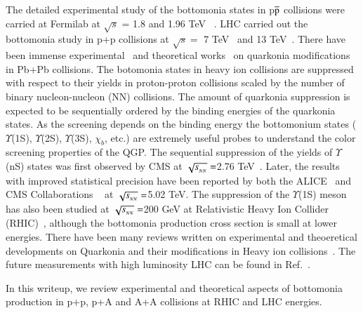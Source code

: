 The detailed experimental study of the bottomonia states in p$\overline{\rm p}$ collisions 
were carried at Fermilab at $\surd s$ = 1.8 and 1.96 TeV ~\cite{CDF:1995gwi,CDF:2001fdy,D0:2005klj}.
LHC carried out the bottomonia study in p+p collisions at
$\surd s=$ 7 TeV~\cite{CMS:2010wld,CMS:2015xqv,ATLAS:2012lmu} and
13 TeV~\cite{CMS:2017dju,LHCb:2018yzj}.
There have been immense
experimental~\cite{Sirunyan:2017isk,Sirunyan:2017lzi,CMS:2018zza,Acharya:2019iur,ALICE:2018wzm}
and theoretical works~\cite{Strickland:2011mw,Song:2011nu,Kumar:2014kfa,Kumar:2019xdj} on
quarkonia modifications in Pb+Pb collisions.
The botomonia states in heavy ion collisions are suppressed with respect to their yields
in proton-proton collisions scaled by the number of binary nucleon-nucleon
(NN) collisions.
The amount of quarkonia suppression is expected to be sequentially ordered by the binding
energies of the quarkonia states.
 As the screening depends on the  binding energy the bottomonium states ($\Upsilon$(1S), $\Upsilon$(2S),
$\Upsilon$(3S), $\chi_{b}$, etc.) are extremely useful probes to understand the color screening
properties of the QGP.
The sequential suppression of the yields of $\Upsilon$(nS) states was first observed by
CMS at $\sqrt{s_{_{NN}}} =$2.76 TeV~\cite{Chatrchyan:2011pe,Chatrchyan:2012lxa}. Later, the results with
improved statistical precision have been reported by both the ALICE~\cite{ALICE:2018wzm}
and CMS Collaborations ~\cite{Sirunyan:2017lzi,CMS:2018zza} at $\sqrt{s_{_{NN}}} =$5.02 TeV.
The suppression of the $\Upsilon$(1S)
meson has also been studied at $\sqrt{s_{_{NN}}} =$200 GeV at Relativistic Heavy Ion Collider
(RHIC)~\cite{STAR:2013kwk}, although the 
bottomonia production cross section is small at lower energies.
There have been many reviews written on experimental and theoeretical developments on Quarkonia and
their modifications in Heavy ion collisions~\cite{Brambilla:2010cs,Andronic:2015wma,Rothkopf:2019ipj}.
The future measurements with high luminosity LHC can be found in Ref.~\cite{Chapon:2020heu}.

In this writeup, we review experimental and theoretical aspects of bottomonia production in p+p, p+A
and A+A collisions at RHIC and LHC energies.







